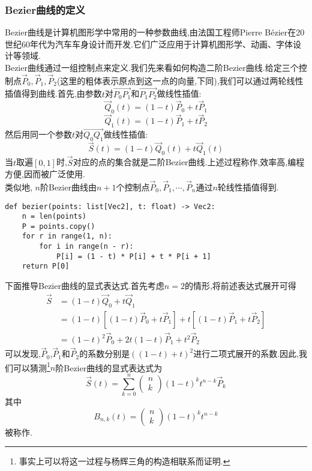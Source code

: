 \documentclass{ctexart}
\begin{document}
\subsubsection{Bezier曲线的定义}
Bezier曲线是计算机图形学中常用的一种参数曲线,由法国工程师Pierre Bézier在20世纪60年代为汽车车身设计而开发.它们广泛应用于计算机图形学、动画、字体设计等领域.\\
\indent Bezier曲线通过一组控制点来定义.我们先来看如何构造二阶Bezier曲线.给定三个控制点$\vec{P}_0,\vec{P}_1,\vec{P}_2$(这里的粗体表示原点到这一点的向量,下同),我们可以通过两轮线性插值得到曲线.首先,由参数$t$对$\overrightarrow{P_0P_1}$和$\overrightarrow{P_1P_2}$做线性插值:
\[\vec{Q}_0(t)=(1-t)\vec{P}_0+t\vec{P}_1\]
\[\vec{Q}_1(t)=(1-t)\vec{P}_1+t\vec{P}_2\]
然后用同一个参数$t$对$\overrightarrow{Q_0Q_1}$做线性插值:
\[\vec{S}(t)=(1-t)\vec{Q}_0(t)+t\vec{Q}_1(t)\]
当$t$取遍$[0,1]$时,$\vec{S}$对应的点的集合就是二阶Bezier曲线.上述过程称作,效率高,编程方便,因而被广泛使用.\\
\indent 类似地, $n$阶Bezier曲线由$n+1$个控制点$\vec{P}_0,\vec{P}_1,\cdots,\vec{P}_n$通过$n$轮线性插值得到.
\begin{lstlisting}
def bezier(points: list[Vec2], t: float) -> Vec2:
    n = len(points)
    P = points.copy()
    for r in range(1, n):
        for i in range(n - r):
            P[i] = (1 - t) * P[i] + t * P[i + 1]
    return P[0]
\end{lstlisting}
\indent 下面推导Bezier曲线的显式表达式.首先考虑$n=2$的情形,将前述表达式展开可得
\[\begin{aligned}
    \vec{S}
    &= (1-t)\vec{Q}_0+t\vec{Q}_1\\
    &= (1-t)\left[(1-t)\vec{P}_0+t\vec{P}_1\right]+t\left[(1-t)\vec{P}_1+t\vec{P}_2\right]\\
    &= (1-t)^2\vec{P}_0+2t(1-t)\vec{P}_1+t^2\vec{P}_2
\end{aligned}\]
可以发现,$\vec{P}_0$,$\vec{P}_1$和$\vec{P}_2$的系数分别是$((1-t)+t)^2$进行二项式展开的系数.因此,我们可以猜测\footnote{事实上可以将这一过程与杨辉三角的构造相联系而证明.}$n$阶Bezier曲线的显式表达式为
\[\vec{S}(t)=\sum_{k=0}^{n}\begin{pmatrix}n\\k\end{pmatrix}(1-t)^kt^{n-k}\vec{P}_k\]
其中
\[B_{n,k}(t)=\begin{pmatrix}n\\k\end{pmatrix}(1-t)^kt^{n-k}\]
被称作.\\
\end{document}
